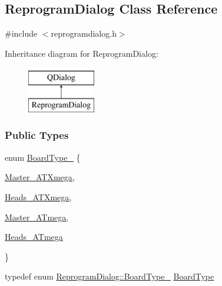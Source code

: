 \hypertarget{classReprogramDialog}{}\subsection{Reprogram\+Dialog Class Reference}
\label{classReprogramDialog}


{\ttfamily \#include $<$reprogramdialog.\+h$>$}

Inheritance diagram for Reprogram\+Dialog\+:\begin{figure}[H]
\begin{center}
\leavevmode
\includegraphics[height=2.000000cm]{classReprogramDialog}
\end{center}
\end{figure}
\subsubsection*{Public Types}
\begin{DoxyCompactItemize}
\item 
enum \mbox{\hyperlink{classReprogramDialog_a068bfc2d12863d24912b9ead24679b4a}{Board\+Type\+\_\+}} \{
\begin{DoxyCompactItemize} \item\mbox{\hyperlink{classReprogramDialog_a068bfc2d12863d24912b9ead24679b4aa384bf879731c24c01d00697b7f9daae9}{Master\+\_\+\+A\+T\+Xmega}}, 
\item\mbox{\hyperlink{classReprogramDialog_a068bfc2d12863d24912b9ead24679b4aaa55ff2104b7e7442625068c67e776d7e}{Heads\+\_\+\+A\+T\+Xmega}}, 
\item\mbox{\hyperlink{classReprogramDialog_a068bfc2d12863d24912b9ead24679b4aa2387446a69abe0ec84b008897037cb75}{Master\+\_\+\+A\+Tmega}}, 
\item\mbox{\hyperlink{classReprogramDialog_a068bfc2d12863d24912b9ead24679b4aaf3e17588a0c29e9b10dda1f9e3df9f6c}{Heads\+\_\+\+A\+Tmega}}
\end{DoxyCompactItemize}
 \}
\item 
typedef enum \mbox{\hyperlink{classReprogramDialog_a068bfc2d12863d24912b9ead24679b4a}{Reprogram\+Dialog\+::\+Board\+Type\+\_\+}} \mbox{\hyperlink{classReprogramDialog_a95e0c039a5de1ea8d3ad44a6ccf17b6a}{Board\+Type}}
\end{DoxyCompactItemize}
